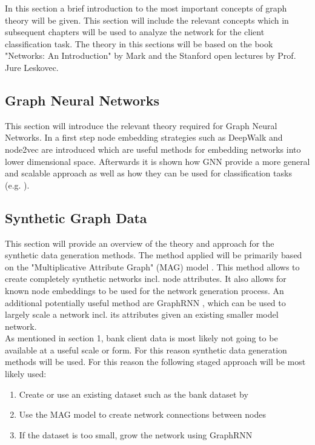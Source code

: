 \documentclass[12pt,a4paper]{article}
\begin{document}
	In this section a brief introduction to the most important concepts of graph theory will be given. This section will include the relevant concepts
	which in subsequent chapters will be used to analyze the network for the client classification task. The theory in this sections will be based on
	the book "Networks: An Introduction" by Mark \citet*{Newman2010} and the Stanford open lectures by Prof. Jure Leskovec. 
	
	\subsection{Graph Neural Networks}

	This section will introduce the relevant theory required for Graph Neural Networks. In a first step node embedding strategies such as 
	DeepWalk \citep{perozzi2014deepwalk} and node2vec \citep{grover2016node2vec} are introduced which are useful methods for embedding networks into 
	lower dimensional space. Afterwards it is shown how GNN provide a more general and scalable approach as well as how they can be used for 
	classification tasks (e.g. \citet{kipf2016semi}).

	\subsection{Synthetic Graph Data}

	This section will provide an overview of the theory and approach for the synthetic data generation methods. The method applied will be primarily
	based on the "Multiplicative Attribute Graph" (MAG) model \citep{kim2012multiplicative}. This method allows to create completely synthetic 
	networks incl. node attributes. It also allows for known node embeddings to be used for the network generation process. An additional potentially 
	useful method are GraphRNN \citep{you2018graphrnn}, which can be used to largely scale a network incl. its attributes given an existing smaller
	model network. \\ 

	\noindent As mentioned in section 1, bank client data is most likely not going to be available at a useful scale or form. For this reason synthetic data 
	generation methods will be used. For this reason the following staged approach will be most likely used:

	\begin{enumerate}
		\itemsep-0.5em
		\item Create or use an existing dataset such as the bank dataset by \citet{moro2014data}
		\item Use the MAG model to create network connections between nodes
		\item If the dataset is too small, grow the network using GraphRNN
	\end{enumerate}
	
\end{document}
